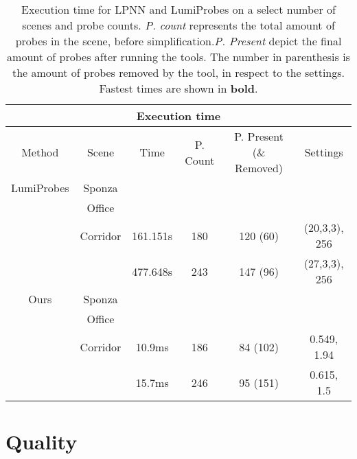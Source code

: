 \begin{table}
	\centering
\begin{tabular}{ |c||c|c|c|c|c|  }
	\hline
	\multicolumn{6}{|c|}{Execution time} \\
	\hline
	Method & Scene & Time & P. Count & P. Present (\& Removed) & Settings\\
	\hline
	LumiProbes & Sponza   &          &     &      &      \\
	\cline{2-5}
	           & Office   &          &     &      &      \\
	\cline{2-5}
	           & Corridor & 161.151s & 180 & 120 (60) & (20,3,3), 256\\
	           &          & 477.648s & 243 & 147 (96) & (27,3,3), 256\\
	\hline
	\hline
	Ours       & Sponza    &       &     &           &             \\
	\cline{2-5}
               & Office    &       &     &           &             \\
    \cline{2-5}
    		   & Corridor & 10.9ms & 186 & 84 (102)  & 0.549, 1.94 \\
               &          & 15.7ms & 246 & 95 (151)  & 0.615, 1.5  \\
               
	\hline
\end{tabular}
\caption{Execution time for LPNN and LumiProbes on a select number of scenes and probe counts. \textit{P. count} represents the total amount of probes in the scene, before simplification.\textit{P. Present} depict the final amount of probes after running the tools. The number in parenthesis is the amount of probes removed by the tool, in respect to the settings. Fastest times are shown in \textbf{bold}.}
\label{table:times}
\end{table}

\section{Quality}
\label{sec:4_quality}

